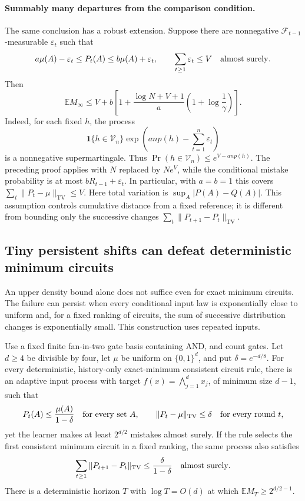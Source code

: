 \paragraph{Summably many departures from the comparison condition.}
The same conclusion has a robust extension.  Suppose there are
nonnegative $\mathcal F_{t-1}$-measurable $\varepsilon_t$ such that
\[
 a\mu(A)-\varepsilon_t\le P_t(A)
 \le b\mu(A)+\varepsilon_t,
 \qquad \sum_{t\ge1}\varepsilon_t\le V\quad\hbox{almost surely}.
\]
Then
\[
 \mathbb E M_\infty
 \le V+b\left[1+\frac{\log N+V+1}{a}
                         \left(1+\log\frac1\gamma\right)\right].
\]
Indeed, for each fixed $h$, the process
\[
 \mathbf1\{h\in\mathcal V_n\}
 \exp\!\left(anp(h)-\sum_{t=1}^n\varepsilon_t\right)
\]
is a nonnegative supermartingale.  Thus
$\Pr(h\in\mathcal V_n)\le e^{V-anp(h)}$.
The preceding proof applies with $N$ replaced by $Ne^V$, while the
conditional mistake probability is at most $bR_{t-1}+\varepsilon_t$.
In particular, with $a=b=1$ this covers
$\sum_t\|P_t-\mu\|_{\mathrm{TV}}\le V$.
Here total variation is $\sup_A|P(A)-Q(A)|$.
This assumption controls cumulative distance from a fixed reference; it
is different from bounding only the successive changes
$\sum_t\|P_{t+1}-P_t\|_{\mathrm{TV}}$.


\subsection{Tiny persistent shifts can defeat deterministic minimum circuits}
\label{sec:smooth-lower}

An upper density bound alone does not suffice even for exact minimum
circuits.  The failure can persist when every conditional input law is
exponentially close to uniform and, for a fixed ranking of circuits, the
sum of successive distribution changes is exponentially small.
This construction uses repeated inputs.

\begin{proposition}
\label{prop:upper-smooth-lower}
Use a fixed finite fan-in-two gate basis containing AND, and count gates.
Let $d\ge4$ be divisible by four, let $\mu$ be uniform on
$\{0,1\}^d$, and put $\delta=e^{-d/8}$.
For every deterministic, history-only exact-minimum consistent circuit
rule, there is an adaptive input process with target
$f(x)=\bigwedge_{j=1}^d x_j$, of minimum size $d-1$, such that
\[
 P_t(A)\le\frac{\mu(A)}{1-\delta}\quad\hbox{for every set }A,
 \qquad \|P_t-\mu\|_{\rm TV}\le\delta
 \quad\hbox{for every round }t,
\]
yet the learner makes at least $2^{d/2}$ mistakes almost surely.
If the rule selects the first consistent minimum circuit in a fixed
ranking, the same process also satisfies
\[
 \sum_{t\ge1}\|P_{t+1}-P_t\|_{\rm TV}
 \le\frac{\delta}{1-\delta}\quad\hbox{almost surely}.
\]
There is a deterministic horizon $T$ with $\log T=O(d)$ at which
$\mathbb E M_T\ge2^{d/2-1}$.
\end{proposition}


